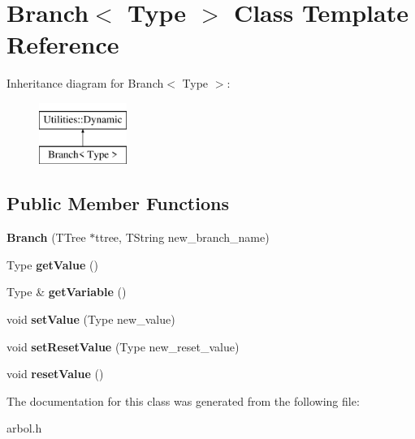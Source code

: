\hypertarget{classBranch}{}\section{Branch$<$ Type $>$ Class Template Reference}
\label{classBranch}
Inheritance diagram for Branch$<$ Type $>$\+:\begin{figure}[H]
\begin{center}
\leavevmode
\includegraphics[height=2.000000cm]{classBranch}
\end{center}
\end{figure}
\subsection*{Public Member Functions}
\begin{DoxyCompactItemize}
\item 
{\bfseries Branch} (T\+Tree $\ast$ttree, T\+String new\+\_\+branch\+\_\+name)\hypertarget{classBranch_aeb963f83cf85bbcdef023ddbc020a46a}{}\label{classBranch_aeb963f83cf85bbcdef023ddbc020a46a}

\item 
Type {\bfseries get\+Value} ()\hypertarget{classBranch_abe830de2e0e7c0df57fdb51436631e1e}{}\label{classBranch_abe830de2e0e7c0df57fdb51436631e1e}

\item 
Type \& {\bfseries get\+Variable} ()\hypertarget{classBranch_ac7b3edc772ed824c18d192db455ef80a}{}\label{classBranch_ac7b3edc772ed824c18d192db455ef80a}

\item 
void {\bfseries set\+Value} (Type new\+\_\+value)\hypertarget{classBranch_abe26b3df8dc53eeb1770d853a39865b1}{}\label{classBranch_abe26b3df8dc53eeb1770d853a39865b1}

\item 
void {\bfseries set\+Reset\+Value} (Type new\+\_\+reset\+\_\+value)\hypertarget{classBranch_a390e9610f26ce93743237dbe3695b4c1}{}\label{classBranch_a390e9610f26ce93743237dbe3695b4c1}

\item 
void {\bfseries reset\+Value} ()\hypertarget{classBranch_aff52fd008db1471e60107522bc62dfb7}{}\label{classBranch_aff52fd008db1471e60107522bc62dfb7}

\end{DoxyCompactItemize}


The documentation for this class was generated from the following file\+:\begin{DoxyCompactItemize}
\item 
arbol.\+h\end{DoxyCompactItemize}
